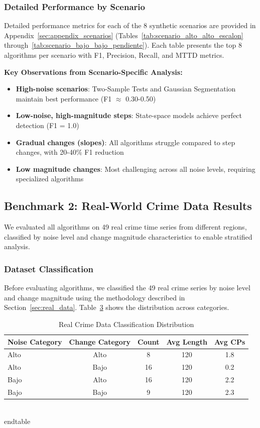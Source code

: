 \begin{table}[H]
\begin{table}[H]
\subsubsection{Detailed Performance by Scenario}

Detailed performance metrics for each of the 8 synthetic scenarios are provided in Appendix~\ref{sec:appendix_scenarios} (Tables~\ref{tab:scenario_alto_alto_escalon} through~\ref{tab:scenario_bajo_bajo_pendiente}). Each table presents the top 8 algorithms per scenario with F1, Precision, Recall, and MTTD metrics.

\textbf{Key Observations from Scenario-Specific Analysis:}
\begin{itemize}
    \item \textbf{High-noise scenarios}: Two-Sample Tests and Gaussian Segmentation maintain best performance (F1 $\approx$ 0.30-0.50)
    \item \textbf{Low-noise, high-magnitude steps}: State-space models achieve perfect detection (F1 = 1.0)
    \item \textbf{Gradual changes (slopes)}: All algorithms struggle compared to step changes, with 20-40\% F1 reduction
    \item \textbf{Low magnitude changes}: Most challenging across all noise levels, requiring specialized algorithms
\end{itemize}


\subsection{Benchmark 2: Real-World Crime Data Results}
\label{sec:results_real}

We evaluated all algorithms on 49 real crime time series from different regions, classified by noise level and change magnitude characteristics to enable stratified analysis.

\subsubsection{Dataset Classification}

Before evaluating algorithms, we classified the 49 real crime series by noise level and change magnitude using the methodology described in Section~\ref{sec:real_data}. Table~\ref{tab:real_classification} shows the distribution across categories.

\begin{table}[H]
\centering
\caption{Real Crime Data Classification Distribution}
\label{tab:real_classification}
\small
\begin{tabular}{lcccc}
\toprule
\textbf{Noise Category} & \textbf{Change Category} & \textbf{Count} & \textbf{Avg Length} & \textbf{Avg CPs} \\
\midrule
Alto & Alto & 8 & 120 & 1.8 \\
Alto & Bajo & 16 & 120 & 0.2 \\
Bajo & Alto & 16 & 120 & 2.2 \\
Bajo & Bajo & 9 & 120 & 2.3 \\
\bottomrule
\end{tabular}
\\end{table}


\end{table}
\end{table}
\end{table}
